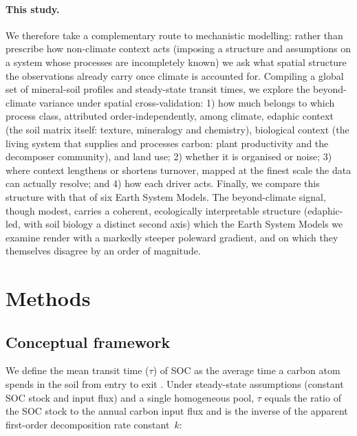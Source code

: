 \documentclass[12pt, a4paper]{article}
\begin{document}
\paragraph{This study.}
We therefore take a complementary route to mechanistic modelling: rather than prescribe how
non-climate context acts (imposing a structure and assumptions on a system whose processes are
incompletely known) we ask what spatial structure the observations already carry
once climate is accounted for. Compiling a global set of mineral-soil profiles and
steady-state transit times, we explore the beyond-climate variance under spatial
cross-validation: 
1) how much belongs to which process class, attributed order-independently, among
climate, edaphic context (the soil matrix itself: texture, mineralogy and
chemistry), biological context (the living system that supplies and processes
carbon: plant productivity and the decomposer community), and land use;
2) whether it is organised or noise; 
3) where context lengthens or shortens turnover, mapped at the finest scale the
data can actually resolve; and
4) how each driver acts.
Finally, we compare this structure with that of six
Earth System Models. The beyond-climate signal, though modest, carries a coherent,
ecologically interpretable structure (edaphic-led, with soil biology a distinct
second axis) which the Earth System Models we examine render with a markedly steeper
poleward gradient, and on which they themselves disagree by an order of magnitude.

\section{Methods}
\label{sec:methods}

\subsection{Conceptual framework}
\label{sec:framework}

We define the mean transit time ($\tau$) of SOC as the average time a
carbon atom spends in the soil from entry to exit
\citep{Sierra2017,Sierra2018}. Under steady-state assumptions (constant
SOC stock and input flux) and a single homogeneous pool, $\tau$ equals
the ratio of the SOC stock to the annual carbon input flux and is the
inverse of the apparent first-order decomposition rate constant~$k$:
\end{document}
